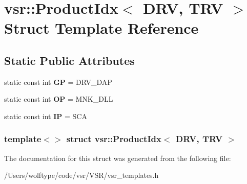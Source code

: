 \hypertarget{structvsr_1_1_product_idx_3_01_d_r_v_00_01_t_r_v_01_4}{\section{vsr\-:\-:Product\-Idx$<$ D\-R\-V, T\-R\-V $>$ Struct Template Reference}
\label{structvsr_1_1_product_idx_3_01_d_r_v_00_01_t_r_v_01_4}
}
\subsection*{Static Public Attributes}
\begin{DoxyCompactItemize}
\item 
\hypertarget{structvsr_1_1_product_idx_3_01_d_r_v_00_01_t_r_v_01_4_ad81f89b9c03286dce1ff2f10e4f6675d}{static const int {\bfseries G\-P} = D\-R\-V\-\_\-\-D\-A\-P}\label{structvsr_1_1_product_idx_3_01_d_r_v_00_01_t_r_v_01_4_ad81f89b9c03286dce1ff2f10e4f6675d}

\item 
\hypertarget{structvsr_1_1_product_idx_3_01_d_r_v_00_01_t_r_v_01_4_a7f70fdd6a58c040da8765a1f925a75ae}{static const int {\bfseries O\-P} = M\-N\-K\-\_\-\-D\-L\-L}\label{structvsr_1_1_product_idx_3_01_d_r_v_00_01_t_r_v_01_4_a7f70fdd6a58c040da8765a1f925a75ae}

\item 
\hypertarget{structvsr_1_1_product_idx_3_01_d_r_v_00_01_t_r_v_01_4_a7c0aa7c56f4afa98b78c078e9b901a30}{static const int {\bfseries I\-P} = S\-C\-A}\label{structvsr_1_1_product_idx_3_01_d_r_v_00_01_t_r_v_01_4_a7c0aa7c56f4afa98b78c078e9b901a30}

\end{DoxyCompactItemize}
\subsubsection*{template$<$$>$ struct vsr\-::\-Product\-Idx$<$ D\-R\-V, T\-R\-V $>$}



The documentation for this struct was generated from the following file\-:\begin{DoxyCompactItemize}
\item 
/\-Users/wolftype/code/vsr/\-V\-S\-R/vsr\-\_\-templates.\-h\end{DoxyCompactItemize}
